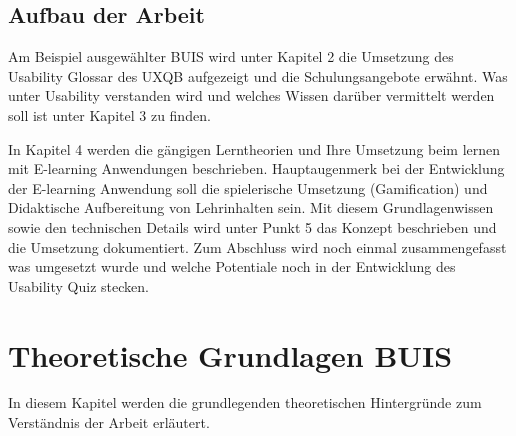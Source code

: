 \documentclass[a4paper, 12pt, twoside, BCOR=20mm, DIV=calc, abstracton, parskip=half*, toc=bibliography, toc=listof, headsepline, footsepline, headings=small, numbers=enddot]{scrreprt}
\begin{document}
	\section{Aufbau der Arbeit}
	Am Beispiel ausgewählter \ac{BUIS} wird unter Kapitel 2 die Umsetzung des Usability Glossar des \ac{UXQB} aufgezeigt und die Schulungsangebote erwähnt. Was unter Usability verstanden wird und welches Wissen darüber vermittelt werden soll ist unter Kapitel 3 zu finden. 
	
	In Kapitel 4 werden die gängigen Lerntheorien und Ihre Umsetzung beim lernen mit E-learning Anwendungen beschrieben. Hauptaugenmerk bei der Entwicklung der E-learning Anwendung soll die spielerische Umsetzung (Gamification) und Didaktische Aufbereitung von Lehrinhalten sein. 
	Mit diesem Grundlagenwissen sowie den technischen Details wird unter Punkt 5 das Konzept beschrieben und die Umsetzung dokumentiert. 
	Zum Abschluss wird noch einmal zusammengefasst was umgesetzt wurde und welche Potentiale noch in der Entwicklung des Usability Quiz stecken. 
	
	\chapter{Theoretische Grundlagen BUIS}
In diesem Kapitel werden die grundlegenden theoretischen Hintergründe zum Verständnis der Arbeit erläutert.
\end{document}
